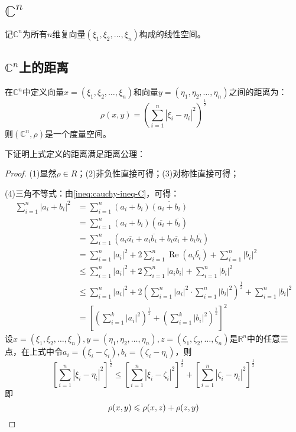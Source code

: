 \section{$\mathbb{C}^n$}

\begin{definition}
	记$\mathbb{C}^n$为所有$n$维复向量$(\xi_1,\xi_2,\dots,\xi_n)$构成的线性空间。
\end{definition}

\subsection{$\mathbb{C}^n$上的距离}
\begin{definition}
	在$\mathbb{C}^n$中定义向量$x=(\xi_1,\xi_2,\dots,\xi_n)$和向量$y=(\eta_1,\eta_2,\dots,\eta_n)$之间的距离为：
	\begin{equation*}
		\rho(x,y)=\left(\sum_{i=1}^n|\xi_i-\eta_i|^2\right)^{\frac{1}{2}}
	\end{equation*}
	则$(\mathbb{C}^n,\rho)$是一个度量空间。
\end{definition}
下证明上式定义的距离满足距离公理：
\begin{proof}
	(1)显然$\rho\in R$；(2)非负性直接可得；(3)对称性直接可得；\par
	(4)三角不等式：由\cref{ineq:cauchy-ineq-C}，可得：
	\begin{align*}
		\sum_{i=1}^n|a_i+b_i|^2
		&=\sum_{i=1}^{n}(a_i+b_i)\overline{(a_i+b_i)} \\
		&=\sum_{i=1}^{n}(a_i+b_i)(\overline{a_i}+\overline{b_i}) \\
		&=\sum_{i=1}^{n}(a_i\overline{a_i}+a_i\overline{b_i}+b_i\overline{a_i}+b_i\overline{b_i}) \\
		&=\sum_{i=1}^{n}|a_i|^2+2\sum_{i=1}^{n}\operatorname{Re}(a_i\overline{b_i})+\sum_{i=1}^{n}|b_i|^2 \\
		&\leqslant\sum_{i=1}^n|a_i|^2+2\sum_{i=1}^n|a_ib_i|+\sum_{i=1}^n|b_i|^2 \\
		&\leqslant\sum_{i=1}^n|a_i|^2+2\left(\sum_{i=1}^n|a_i|^2\cdot\sum_{i=1}^n|b_i|^2\right)^{\frac{1}{2}}+\sum_{i=1}^n|b_i|^2 \\
		&=\left[\left(\sum_{i=1}^k|a_i|^2\right)^{\frac{1}{2}}+\left(\sum_{i=1}^k|b_i|^2\right)^{\frac{1}{2}}\right]^2
	\end{align*}
	设$x=(\xi_1,\xi_2,\dots,\xi_n),y=(\eta_1,\eta_2,\dots,\eta_n),z=(\zeta_1,\zeta_2,\dots,\zeta_n)$是$\mathbb{R}^n$中的任意三点，在上式中令$a_i=(\xi_i-\zeta_i),b_i=(\zeta_i-\eta_i)$，则
	\begin{equation*}
		\left[\sum_{i=1}^n|\xi_i-\eta_i|^2\right]^{\frac{1}{2}}\leqslant	\left[\sum_{i=1}^n|\xi_i-\zeta_i|^2\right]^{\frac{1}{2}}+\left[\sum_{i=1}^n|\zeta_i-\eta_i|^2\right]^{\frac{1}{2}}
	\end{equation*}
	即
	\begin{equation*}
		\rho(x,y)\leqslant\rho(x,z)+\rho(z,y)\qedhere
	\end{equation*}
\end{proof}
